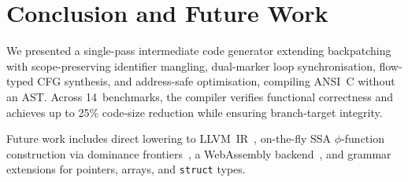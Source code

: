\documentclass[conference]{IEEEtran}
\begin{document}
\section{Conclusion and Future Work}
We presented a single-pass intermediate code generator extending backpatching with scope-preserving identifier mangling, dual-marker loop synchronisation, flow-typed CFG synthesis, and address-safe optimisation, compiling ANSI~C without an AST. Across 14~benchmarks, the compiler verifies functional correctness and achieves up to 25\% code-size reduction while ensuring branch-target integrity.

Future work includes direct lowering to LLVM~IR~\cite{llvm}, on-the-fly SSA $\phi$-function construction via dominance frontiers~\cite{cytron1991,braun2022}, a WebAssembly backend~\cite{wasmhaas}, and grammar extensions for pointers, arrays, and \texttt{struct} types.
\end{document}
